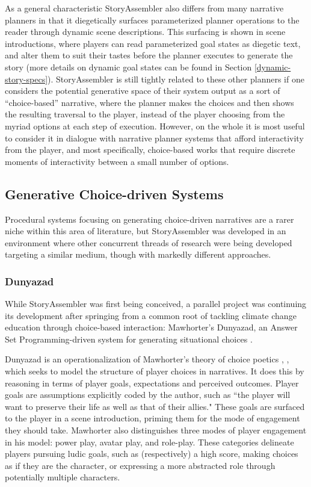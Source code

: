As a general characteristic StoryAssembler also differs from many narrative planners in that it diegetically surfaces parameterized planner operations to the reader through dynamic scene descriptions. This surfacing is shown in scene introductions, where players can read parameterized goal states as diegetic text, and alter them to suit their tastes before the planner executes to generate the story (more details on dynamic goal states can be found in Section \ref{dynamic-story-specs}). StoryAssembler is still tightly related to these other planners if one considers the potential generative space of their system output as a sort of ``choice-based'' narrative, where the planner makes the choices and then shows the resulting traversal to the player, instead of the player choosing from the myriad options at each step of execution. However, on the whole it is most useful to consider it in dialogue with narrative planner systems that afford interactivity from the player, and most specifically, choice-based works that require discrete moments of interactivity between a small number of options.

\subsection{Generative Choice-driven Systems}
\label{sec:sa-gen-choice-refs}

Procedural systems focusing on generating choice-driven narratives are a rarer niche within this area of literature, but StoryAssembler was developed in an environment where other concurrent threads of research were being developed targeting a similar medium, though with markedly different approaches.

\subsubsection{Dunyazad}

While StoryAssembler was first being conceived, a parallel project was continuing its development after springing from a common root of tackling climate change education through choice-based interaction: Mawhorter's Dunyazad, an Answer Set Programming-driven system for generating situational choices \cite{dunyazad}. 

Dunyazad is an operationalization of Mawhorter's theory of choice poetics \cite{dunyazad}, \cite{mawhorter_diss}, which seeks to model the structure of player choices in narratives. It does this by reasoning in terms of player goals, expectations and perceived outcomes. Player goals are assumptions explicitly coded by the author, such as ``the player will want to preserve their life as well as that of their allies." These goals are surfaced to the player in a scene introduction, priming them for the mode of engagement they should take. Mawhorter also distinguishes three modes of player engagement in his model: power play, avatar play, and role-play. These categories delineate players pursuing ludic goals, such as (respectively) a high score, making choices as if they are the character, or expressing a more abstracted role through potentially multiple characters.

